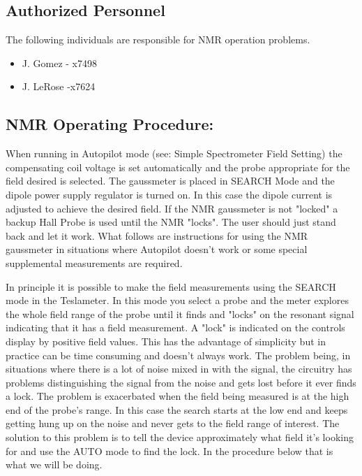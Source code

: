 \subsection{Authorized Personnel}
The following individuals are responsible for NMR operation problems.

\begin{itemize} 
\item[~]J. Gomez - x7498 
\item[~]J. LeRose -x7624
\end{itemize} 

\subsection{NMR Operating Procedure:}

When running in Autopilot mode (see: Simple Spectrometer Field Setting) the 
compensating coil voltage is set automatically and the probe appropriate for 
the field desired is selected. The gaussmeter is placed in SEARCH Mode and the 
dipole power supply regulator is turned on. In this case the dipole current is 
adjusted to achieve the desired field. If the NMR gaussmeter is not "locked" a 
backup Hall Probe is used until the NMR "locks".  The user should just stand 
back and let it work. What follows are instructions for using
the NMR gaussmeter in situations where Autopilot doesn't work or
some special supplemental measurements are required. 

 In principle it is possible to make the field measurements using the 
SEARCH mode in the Teslameter.  In this mode you select a probe and the 
meter explores the whole field range of the probe until it finds and 
"locks" on the resonant signal indicating that it has a field 
measurement.  A "lock" is indicated on the controls display by positive 
field values.  This has the advantage of simplicity but in practice can 
be time consuming and doesn't always work.  The problem being, in 
situations where there is a lot of noise mixed in with the signal, the 
circuitry has problems distinguishing the signal from the noise and gets 
lost before it ever finds a lock.  The problem is exacerbated when the 
field being measured is at the high end of the probe's range.  In this 
case the search starts at the low end and keeps getting hung up on the 
noise and never gets to the field range of interest.  The solution to 
this problem is to tell the device approximately what field it's looking 
for and use the AUTO mode to find the lock.  In the procedure below that 
is what we will be doing.

